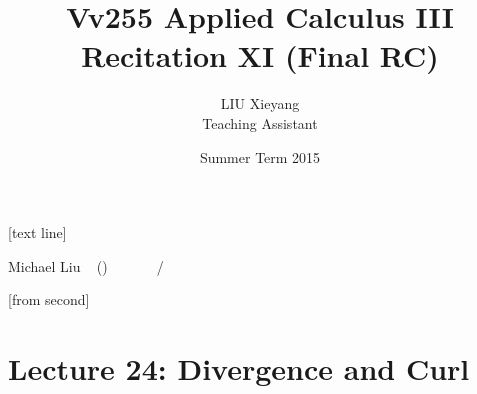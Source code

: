 \documentclass[10pt]{beamer}
\begin{document}



[text line]{%
	\color{blue!40!black}\parbox{\linewidth}{\vspace*{-8pt}Michael Liu ~ (\insertshortinstitute)\hfill\insertshorttitle\hfill\insertshortdate~~~~~~\insertframenumber{}~/~\inserttotalframenumber}}


[from second] 

\newcommand{\tabincell}[2]{\begin{tabular}{@{}#1@{}}#2\end{tabular}}


\title[Vv255 Applied Calculus III]{Vv255 Applied Calculus III\\{\small Recitation XI (Final RC)}}   
\author[Michael Liu]{LIU Xieyang\\{\tiny Teaching Assistant}} 
\date[Summer 2015]{Summer Term 2015} 
\begin{frame}
	\titlepage
\end{frame}






\section{Lecture 24: Divergence and Curl} 
\end{document}
